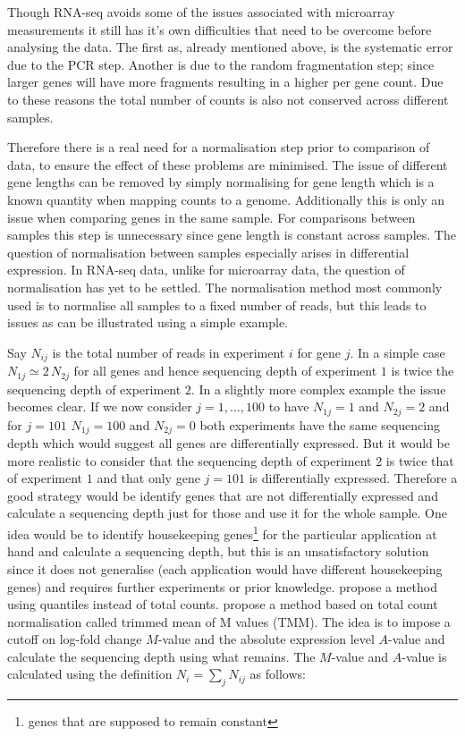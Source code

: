 Though RNA-seq avoids some of the issues associated with microarray measurements it still has it's own difficulties that need to be overcome before analysing the data. The first as, already mentioned above, is the systematic error due to the PCR step. Another is due to the random fragmentation step; since larger genes will have more fragments resulting in a higher per gene count. Due to these reasons the total number of counts is also not conserved across different samples.

Therefore there is a real need for a normalisation step prior to comparison of data, to ensure the effect of these problems are minimised. The issue of different gene lengths can be removed by simply normalising for gene length which is a known quantity when  mapping counts to a genome. Additionally this is only an issue when comparing genes in the same sample. For comparisons between samples this step is unnecessary since gene length is constant across samples. The question of normalisation between samples especially arises in differential expression. In RNA-seq data, unlike for microarray data, the question of normalisation has yet to be settled. The normalisation method most commonly used is to normalise all samples to a fixed number of reads, but this leads to issues as can be illustrated using a simple example.

Say $N_{ij}$ is the total number of reads in experiment $i$ for gene $j$. In a simple case $N_{1j} \simeq 2 \, N_{2j}$ for all genes and hence sequencing depth of experiment $1$ is twice the sequencing depth of experiment $2$. In a slightly more complex example the issue becomes clear. If we now consider $j = 1, \ldots,  100$ to have $N_{1j} = 1$ and $N_{2j} = 2$ and for $j = 101$ $N_{1j} = 100$ and $N_{2j} = 0$ both experiments have the same sequencing depth which would suggest all genes are differentially expressed. But it would be more realistic to consider that the sequencing depth of experiment $2$ is twice that of experiment $1$ and that only gene $j = 101$ is differentially expressed. Therefore a good strategy would be identify genes that are not differentially expressed and calculate a sequencing depth just for those and use it for the whole sample. One idea would be to identify housekeeping genes\footnote{genes that are supposed to remain constant} for the particular application at hand and calculate a sequencing depth, but this is an unsatisfactory solution since it does not generalise (each application would have different housekeeping genes) and requires further experiments or prior knowledge. \cite{Bullard:2010go} propose a method using quantiles instead of total counts. \cite{Robinson:2010dd} propose a method based on total count normalisation called trimmed mean of M values (TMM). The idea is to impose a cutoff on log-fold change $M$-value and the absolute expression level $A$-value and calculate the sequencing depth using what remains. The $M$-value  and $A$-value is calculated using the definition $N_i = \sum_j N_{ij} $ as follows:

